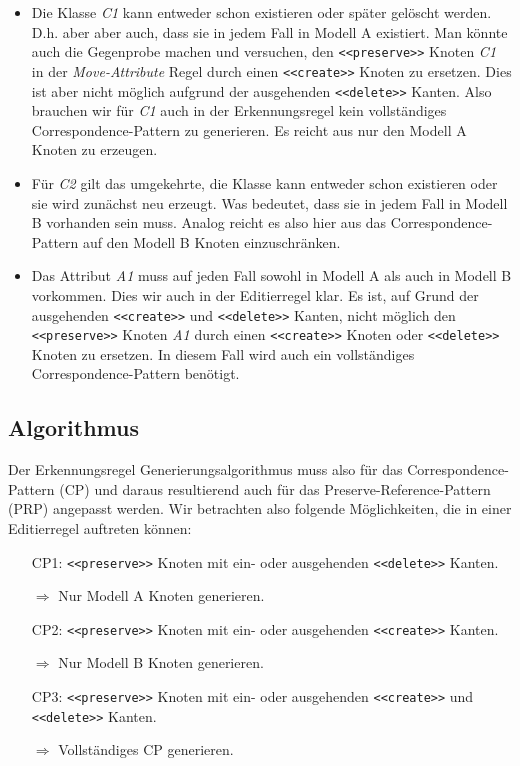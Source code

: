 \begin{itemize}
  \item Die Klasse \textit{C1} kann entweder schon existieren oder später gelöscht werden. D.h. aber aber
  auch, dass sie in jedem Fall in Modell A existiert. Man könnte auch die Gegenprobe machen und
  versuchen, den \texttt{<<preserve>>} Knoten \textit{C1} in der \textit{Move-Attribute} Regel durch
  einen \texttt{<<create>>} Knoten zu ersetzen. Dies ist aber nicht möglich aufgrund der ausgehenden
  \texttt{<<delete>>} Kanten. Also brauchen wir für \textit{C1} auch in der Erkennungsregel kein
  vollständiges Correspondence-Pattern zu generieren. Es reicht aus nur den Modell A Knoten zu
  erzeugen.

  \item Für \textit{C2} gilt das umgekehrte, die Klasse kann entweder schon existieren oder sie wird
  zunächst neu erzeugt. Was bedeutet, dass sie in jedem Fall in Modell B vorhanden sein muss. Analog
  reicht es also hier aus das Correspondence-Pattern auf den Modell B Knoten einzuschränken.

  \item Das Attribut \textit{A1} muss auf jeden Fall sowohl in Modell A als auch in Modell B
  vorkommen. Dies wir auch in der Editierregel klar. Es ist, auf Grund der ausgehenden
  \texttt{<<create>>} und \texttt{<<delete>>} Kanten, nicht möglich den \texttt{<<preserve>>} Knoten
  \textit{A1} durch einen \texttt{<<create>>} Knoten oder \texttt{<<delete>>} Knoten zu ersetzen. In
  diesem Fall wird auch ein vollständiges Correspondence-Pattern benötigt.
\end{itemize}

\subsection{Algorithmus}

Der Erkennungsregel Generierungsalgorithmus muss also für das Correspondence-Pattern (CP) und daraus
resultierend auch für das Preserve-Reference-Pattern (PRP) angepasst werden. Wir betrachten also
folgende Möglichkeiten, die in einer Editierregel auftreten können:

\begin{enumerate}
  \item[CP1:] \texttt{<<preserve>>} Knoten mit ein- oder ausgehenden \texttt{<<delete>>} Kanten.
  
  $\Rightarrow$ Nur Modell A Knoten generieren.

  \item[CP2:] \texttt{<<preserve>>} Knoten mit ein- oder ausgehenden \texttt{<<create>>} Kanten.
  
  $\Rightarrow$ Nur Modell B Knoten generieren.

  \item[CP3:] \texttt{<<preserve>>} Knoten mit ein- oder ausgehenden \texttt{<<create>>} und
  \texttt{<<delete>>} Kanten.
  
  $\Rightarrow$ Vollständiges CP generieren.
\end{enumerate}

